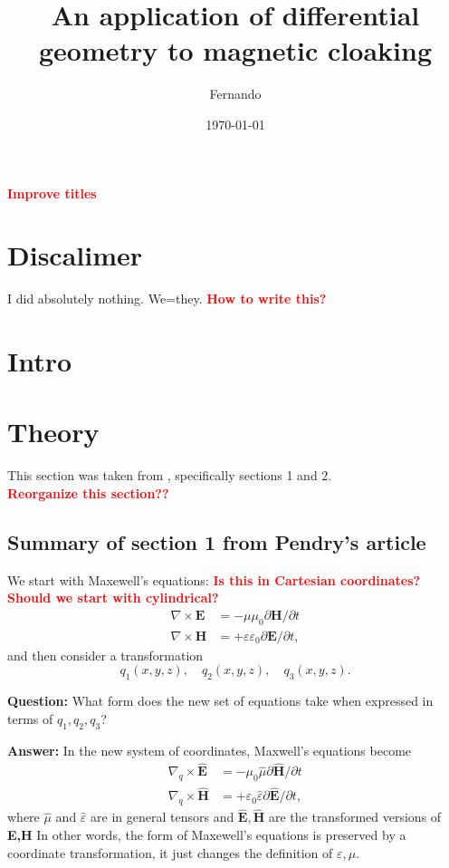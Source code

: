 \documentclass{amsart}
\begin{document}
\newcommand{\R}{\mathbb{R}}
\newcommand\tbf[1]{\textbf{#1}}
\newcommand\myworries[1]{\textcolor{red}{\tbf{#1}}}

\title{An application of differential geometry to magnetic cloaking}
\author{Fernando}
\date{\today}
\maketitle

\myworries{Improve titles}
\section{Discalimer}
I did absolutely nothing. We=they.
\myworries{How to write this?}
\section{Intro}
\blindtext[1]
\section{Theory}
This section was taken from \cite{ward96}, specifically sections 1 and 2.
\myworries{\\Reorganize this section??}
\subsection{Summary of section 1 from Pendry's article}
We start with Maxewell's equations:\myworries{ Is this in Cartesian coordinates? Should we start with cylindrical?}
\begin{align*}
  \nabla \times \tbf{E} &= -\mu \mu_0 \partial \tbf{H} /\partial t\\
  \nabla \times \tbf{H} &= +\varepsilon \varepsilon_0 \partial \tbf{E} /\partial t,
\end{align*}
and then consider a transformation
\[
q_1(x,y,z), \quad q_2(x,y,z), \quad q_3(x,y,z).
\]

\tbf{Question:} What form does the new set of equations take when
expressed in terms of $q_1,q_2,q_3$?

\tbf{Answer:} In the new system of coordinates, Maxwell's equations become
\begin{align*}
  \nabla_q \times \widehat{\tbf{E}} &= -\mu_0\hat{\mu} \partial \widehat{\tbf{H}}/\partial t\\
  \nabla_q \times \widehat{\tbf{H}} &= +\varepsilon_0 \hat{\varepsilon} \partial \widehat{\tbf{E}}/\partial t,
\end{align*}
where $\hat{\mu}$ and $\hat{\varepsilon}$ are in general tensors and $\widehat{\tbf{E}},\widehat{\tbf{H}}$ are the transformed versions of \tbf{E,H}
In other words, the form of Maxewell's equations is preserved by a coordinate transformation, it just changes the definition of $\varepsilon,\mu$.
\end{document}
